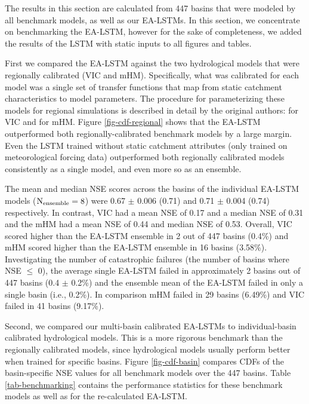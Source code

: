 The results in this section are calculated from 447 basins that were modeled by all benchmark models, as well as our \glspl{EA-LSTM}. In this section, we concentrate on benchmarking the EA-LSTM, however for the sake of completeness, we added the results of the LSTM with static inputs to all figures and tables.

First we compared the \gls{EA-LSTM} against the two hydrological models that were regionally calibrated (VIC and mHM). Specifically, what was calibrated for each model was a single set of transfer functions that map from static catchment characteristics to model parameters. The procedure for parameterizing these models for regional simulations is described in detail by the original authors: \citet{mizukami2017towards} for VIC and \citet{rakovec2019diagnostic} for mHM. Figure \ref{fig-cdf-regional} shows that the \gls{EA-LSTM} outperformed both regionally-calibrated benchmark models by a large margin. Even the \gls{LSTM} trained without static catchment attributes (only trained on meteorological forcing data) outperformed both regionally calibrated models consistently as a single model, and even more so as an ensemble.

The mean and median \gls{NSE} scores across the basins of the individual \gls{EA-LSTM} models ($\textup{N}_{\textup{ensemble}}=8$) were 0.67 $\pm$ 0.006 (0.71) and 0.71 $\pm$ 0.004 (0.74) respectively. In contrast, VIC had a mean \gls{NSE} of 0.17 and a median \gls{NSE} of 0.31 and the mHM had a mean \gls{NSE} of 0.44 and median \gls{NSE} of 0.53. Overall, VIC scored higher than the \gls{EA-LSTM} ensemble in 2 out of 447 basins (0.4\%) and mHM scored higher than the \gls{EA-LSTM} ensemble in 16 basins (3.58\%).
Investigating the number of catastrophic failures (the number of basins where \gls{NSE} $\leq$ 0), the average single \gls{EA-LSTM} failed in approximately 2 basins out of 447 basins (0.4 $\pm$ 0.2\%) and the ensemble mean of the \gls{EA-LSTM} failed in only a single basin (i.e., 0.2\%). In comparison mHM failed in 29 basins (6.49\%) and VIC failed in 41 basins (9.17\%).

Second, we compared our multi-basin calibrated \glspl{EA-LSTM} to individual-basin calibrated hydrological models. This is a more rigorous benchmark than the regionally calibrated models, since hydrological models usually perform better when trained for specific basins. Figure \ref{fig-cdf-basin} compares CDFs of the basin-specific \gls{NSE} values for all benchmark models over the 447 basins. Table \ref{tab-benchmarking} contains the performance statistics for these benchmark models as well as for the re-calculated \gls{EA-LSTM}.

